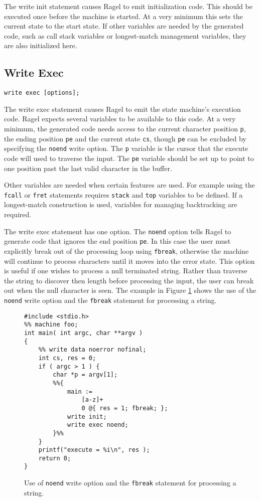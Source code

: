 \documentclass[letterpaper,11pt,oneside]{book}
\newcommand{\verbspace}{\vspace{10pt}}
\begin{document}
The write init statement causes Ragel to emit initialization code. This should
be executed once before the machine is started. At a very minimum this sets the
current state to the start state. If other variables are needed by the
generated code, such as call
stack variables or longest-match management variables, they are also
initialized here.

\subsection{Write Exec}
\begin{verbatim}
write exec [options];
\end{verbatim}
\verbspace

The write exec statement causes Ragel to emit the state machine's execution code.
Ragel expects several variables to be available to this code. At a very minimum, the
generated code needs access to the current character position \verb|p|, the ending
position \verb|pe| and the current state \verb|cs|, though \verb|pe|
can be excluded by specifying the \verb|noend| write option.
The \verb|p| variable is the cursor that the execute code will
used to traverse the input. The \verb|pe| variable should be set up to point to one
position past the last valid character in the buffer.

Other variables are needed when certain features are used. For example using
the \verb|fcall| or \verb|fret| statements requires \verb|stack| and
\verb|top| variables to be defined. If a longest-match construction is used,
variables for managing backtracking are required.

The write exec statement has one option. The \verb|noend| option tells Ragel
to generate code that ignores the end position \verb|pe|. In this
case the user must explicitly break out of the processing loop using
\verb|fbreak|, otherwise the machine will continue to process characters until
it moves into the error state. This option is useful if one wishes to process a
null terminated string. Rather than traverse the string to discover then length
before processing the input, the user can break out when the null character is
seen.  The example in Figure \ref{fbreak-example} shows the use of the
\verb|noend| write option and the \verb|fbreak| statement for processing a string.

\begin{figure}
\small
\begin{verbatim}
#include <stdio.h>
%% machine foo;
int main( int argc, char **argv )
{
    %% write data noerror nofinal;
    int cs, res = 0;
    if ( argc > 1 ) {
        char *p = argv[1];
        %%{ 
            main := 
                [a-z]+ 
                0 @{ res = 1; fbreak; };
            write init;
            write exec noend;
        }%%
    }
    printf("execute = %i\n", res );
    return 0;
}
\end{verbatim}
\caption{Use of {\tt noend} write option and the {\tt fbreak} statement for
processing a string.}
\label{fbreak-example}
\end{figure}
\end{document}
